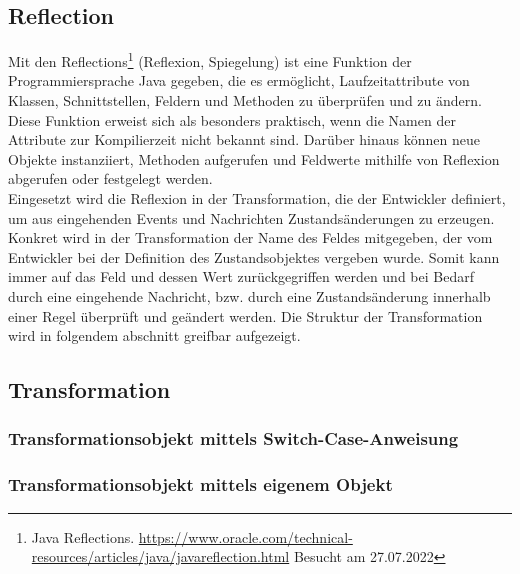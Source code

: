 \subsection{Reflection} 
    Mit den Reflections\footnote{Java Reflections. \url{https://www.oracle.com/technical-resources/articles/java/javareflection.html} Besucht am 27.07.2022} 
    (Reflexion, Spiegelung) ist eine Funktion der Programmiersprache Java gegeben, die es ermöglicht, Laufzeitattribute von Klassen, Schnittstellen, Feldern 
    und Methoden zu überprüfen und zu ändern. Diese Funktion erweist sich als besonders praktisch, wenn die Namen der Attribute zur Kompilierzeit nicht bekannt sind. 
    Darüber hinaus können neue Objekte instanziiert, Methoden aufgerufen und Feldwerte mithilfe von Reflexion abgerufen oder festgelegt werden. 
    \\
    \linebreak
    Eingesetzt wird die Reflexion in der Transformation, die der Entwickler definiert, um aus eingehenden Events und Nachrichten Zustandsänderungen zu erzeugen. Konkret wird in der 
    Transformation der Name des Feldes mitgegeben, der vom Entwickler bei der Definition des Zustandsobjektes vergeben wurde. Somit kann immer auf das Feld und dessen Wert zurückgegriffen werden und bei Bedarf durch eine eingehende Nachricht, bzw. durch eine Zustandsänderung innerhalb einer Regel überprüft und geändert werden. Die Struktur der 
    Transformation wird in folgendem abschnitt greifbar aufgezeigt.

\subsection{Transformation}
\subsubsection*{Transformationsobjekt mittels Switch-Case-Anweisung}
\subsubsection*{Transformationsobjekt mittels eigenem Objekt}
